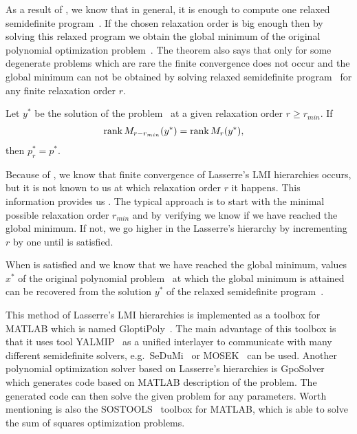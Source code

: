 As a result of , we know that in general, it is enough to compute one relaxed semidefinite program~.
If the chosen relaxation order is big enough then by solving this relaxed program we obtain the global minimum of the original polynomial optimization problem~.
The theorem also says that only for some degenerate problems which are rare the finite convergence does not occur and the global minimum can not be obtained by solving relaxed semidefinite program~ for any finite relaxation order $r$.

\begin{theorem}
  Let $y^*$ be the solution of the problem~ at a given relaxation order $r \geq r_{min}$.
  If
  \begin{align}
    \rank M_{r-r_{min}}(y^*) &= \rank M_r(y^*), \labeleq{pol:lass:certConv}
  \end{align}
  then $p^*_r = p^*$.
\end{theorem}

Because of , we know that finite convergence of Lasserre's LMI hierarchies occurs, but it is not known to us at which relaxation order $r$ it happens.
This information provides us .
The typical approach is to start with the minimal possible relaxation order $r_{min}$ and by verifying  we know if we have reached the global minimum.
If not, we go higher in the Lasserre's hierarchy by incrementing $r$ by one until  is satisfied.

When  is satisfied and we know that we have reached the global minimum, values $x^*$ of the original polynomial problem~ at which the global minimum is attained can be recovered from the solution $y^*$ of the relaxed semidefinite program~.

This method of Lasserre's LMI hierarchies is implemented as a toolbox for MATLAB which is named GloptiPoly~\cite{gloptipoly}.
The main advantage of this toolbox is that it uses tool YALMIP~\cite{yalmip} as a unified interlayer to communicate with many different semidefinite solvers, e.g.\ SeDuMi~\cite{sedumi} or MOSEK~\cite{mosek} can be used.
Another polynomial optimization solver based on Lasserre's hierarchies is GpoSolver~\cite{gposolver} which generates \CPP{} code based on MATLAB description of the problem.
The generated \CPP{} code can then solve the given problem for any parameters.
Worth mentioning is also the SOSTOOLS~\cite{sostools} toolbox for MATLAB, which is able to solve the sum of squares optimization problems.
